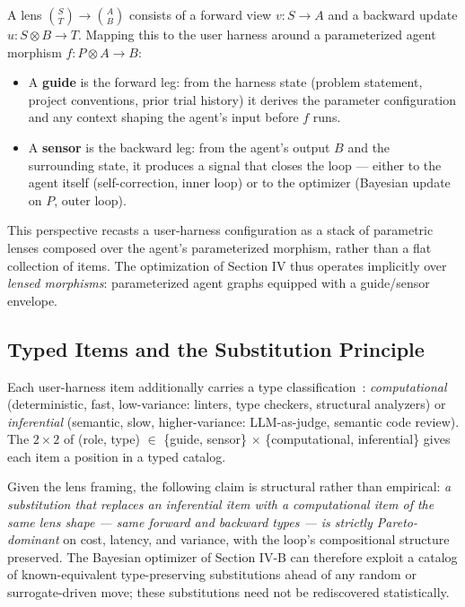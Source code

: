 \documentclass[journal]{IEEEtran}
\begin{document}
A lens $\binom{S}{T} \to \binom{A}{B}$ consists of a forward view $v : S \to A$ and a backward update $u : S \otimes B \to T$. Mapping this to the user harness around a parameterized agent morphism $f : P \otimes A \to B$:
\begin{itemize}
    \item A \textbf{guide} is the forward leg: from the harness state (problem statement, project conventions, prior trial history) it derives the parameter configuration and any context shaping the agent's input before $f$ runs.
    \item A \textbf{sensor} is the backward leg: from the agent's output $B$ and the surrounding state, it produces a signal that closes the loop --- either to the agent itself (self-correction, inner loop) or to the optimizer (Bayesian update on $P$, outer loop).
\end{itemize}

This perspective recasts a user-harness configuration as a stack of parametric lenses composed over the agent's parameterized morphism, rather than a flat collection of items. The optimization of Section IV thus operates implicitly over \emph{lensed morphisms}: parameterized agent graphs equipped with a guide/sensor envelope.

\subsection{Typed Items and the Substitution Principle}

Each user-harness item additionally carries a type classification~\cite{bockeler2026}: \textit{computational} (deterministic, fast, low-variance: linters, type checkers, structural analyzers) or \textit{inferential} (semantic, slow, higher-variance: LLM-as-judge, semantic code review). The $2 \times 2$ of (role, type) $\in$ \{guide, sensor\} $\times$ \{computational, inferential\} gives each item a position in a typed catalog.

Given the lens framing, the following claim is structural rather than empirical: \emph{a substitution that replaces an inferential item with a computational item of the same lens shape --- same forward and backward types --- is strictly Pareto-dominant} on cost, latency, and variance, with the loop's compositional structure preserved. The Bayesian optimizer of Section IV-B can therefore exploit a catalog of known-equivalent type-preserving substitutions ahead of any random or surrogate-driven move; these substitutions need not be rediscovered statistically.
\end{document}
